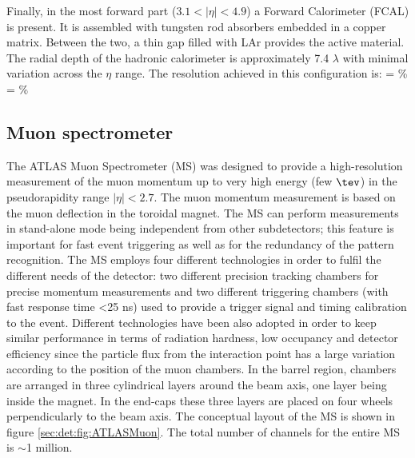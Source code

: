 Finally, in the most forward part ($3.1< |\eta| <4.9$) a Forward Calorimeter (FCAL) is present. It is assembled with tungsten rod absorbers embedded in a copper matrix. Between the two, a thin gap filled with LAr provides the active material. The radial depth of the hadronic calorimeter is approximately 7.4 $\lambda$ with minimal variation across the $\eta$ range.  The resolution achieved in this configuration is:
\be
{} =   \% 
\label{sec:det:eq:TILEresolution}
\ee
\be
{} =   \% 
\label{sec:det:eq:FCALresolution}
\ee

\subsection{Muon spectrometer}

The ATLAS Muon Spectrometer (MS) \cite{ATLASTDR1} was designed to provide a high-resolution measurement of the muon momentum up to very high energy (few $\tev$) in the pseudorapidity range $|\eta|<2.7$. The muon momentum measurement is based on the muon deflection in the toroidal magnet. The MS can perform measurements in stand-alone mode being independent from other subdetectors; this feature is important for fast event triggering as well as for the redundancy of the pattern recognition. The MS employs four different technologies in order to fulfil the different needs of the detector: two different precision tracking chambers for precise momentum measurements and two different triggering chambers (with fast response time <25 ns) used to provide a trigger signal and timing calibration to the event. Different technologies have been also adopted in order to keep similar performance in terms of radiation hardness, low occupancy and detector efficiency since the particle flux from the interaction point has a large variation according to the position of the muon chambers. In the barrel region, chambers are arranged in three cylindrical layers around the beam axis, one layer being inside the magnet. In the end-caps these three layers are placed on four wheels perpendicularly to the beam axis. The conceptual layout of the MS is shown in figure \ref{sec:det:fig:ATLASMuon}. The total number of channels for the entire MS is $\sim$1 million. 

